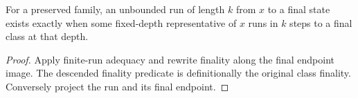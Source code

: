 

\begin{lemma}
For a preserved family, an unbounded run of length $k$ from $x$ to a final state exists exactly when some fixed-depth representative of $x$ runs in $k$ steps to a final class at that depth.
\end{lemma}

\begin{proof}
Apply finite-run adequacy and rewrite finality along the final endpoint image. The descended finality predicate is definitionally the original class finality. Conversely project the run and its final endpoint.
\end{proof}

